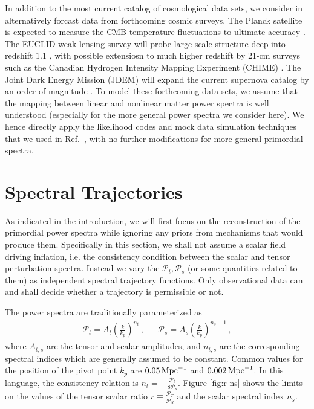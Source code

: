 \documentclass[a4paper,11pt]{article}
\def\mpc{{\rm\,Mpc}}
\def\mpc{{\rm\,Mpc}}
\newcommand{\pscalar}{{\mathcal{P}_s}}
\newcommand{\ptensor}{{\mathcal{P}_t}}
\begin{document}
In addition to the most current catalog of cosmological data sets, we
consider in alternatively forcast data from forthcoming cosmic
surveys. The Planck satellite is expected to measure the CMB
temperature fluctuations to ultimate
accuracy \cite{book_PlanckBlue}. The EUCLID weak lensing survey will
probe large scale structure deep into redshift
$1.1$ \cite{book_EUCLIDYellow}, with possible extensiosn to much
higher redshift by 21-cm surveys such as the Canadian Hydrogen
Intensity Mapping Experiment (CHIME) \cite{book_CHIMEWhite}. The Joint
Dark Energy Mission (JDEM) will expand the current supernova catalog
by an order of magnitude \cite{DETF}. To model these forthcoming data
sets, we assume that the mapping between linear and nonlinear matter
power spectra is well understood (especially for the more general
power spectra we consider here). We hence directly apply the
likelihood codes and mock data simulation techniques that we used in
Ref.~\cite{HBK2010}, with no further modifications for more general
primordial spectra.

\section{Spectral Trajectories}\label{sec:spectral_trajectories}
As indicated in the introduction, we will first focus on the
reconstruction of the primordial power spectra while ignoring any
priors from mechanisms that would produce them. Specifically in this
section, we shall not assume a scalar field driving inflation,
i.e. the consistency condition between the scalar and tensor
perturbation spectra. Instead we vary the $\ptensor,
\pscalar$ (or some quantities related to them) as independent
spectral trajectory functions. Only observational data can and shall
decide whether a trajectory is permissible or not.

The power spectra are traditionally parameterized as
\begin{eqnarray}
  \ptensor=A_t \left(\frac{k}{k_p}\right)^{n_t}\, ,&& \pscalar=A_s\left(\frac{k}{k_p}\right)^{n_s-1}\, ,
\end{eqnarray}
where $A_{t, s}$ are the tensor and scalar amplitudes, and $n_{t, s}$
are the corresponding spectral indices which are generally assumed to
be constant. Common values for the position of the pivot point $k_{p}$
are $0.05\mpc^{-1}$ and $0.002\mpc^{-1}$. In this language, the
consistency relation is
$n_t=-\frac{\ptensor}{8\pscalar}$. Figure \ref{fig:r-ns}
shows the limits on the values of the tensor scalar ratio
$r\equiv\frac{\mathcal{P}_T}{\mathcal{P}_S}$ and the scalar spectral
index $n_s$. 
\end{document}
